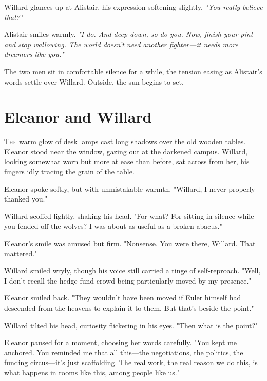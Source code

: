 Willard glances up at Alistair, his expression softening slightly.  
\textit{"You really believe that?"}
\smallskip

Alistair smiles warmly.  
\textit{"I do. And deep down, so do you. Now, finish your pint and stop wallowing. The world doesn’t need another fighter—it needs more dreamers like you."}

\smallskip

The two men sit in comfortable silence for a while, the tension easing as Alistair’s words settle over Willard. Outside, the sun begins to set.

\newpage

\section*{Eleanor and Willard}

\smallskip

\lettrine{T}{he} warm glow of desk lamps cast long shadows over the old wooden tables. Eleanor stood near the window, gazing out at the darkened campus. Willard, looking somewhat worn but more at ease than before, sat across from her, his fingers idly tracing the grain of the table.

\smallskip

Eleanor spoke softly, but with unmistakable warmth.  
"Willard, I never properly thanked you."
\smallskip

Willard scoffed lightly, shaking his head.  
"For what? For sitting in silence while you fended off the wolves? I was about as useful as a broken abacus."
\smallskip

Eleanor’s smile was amused but firm.  
"Nonsense. You were there, Willard. That mattered."
\smallskip

Willard smiled wryly, though his voice still carried a tinge of self-reproach.  
"Well, I don’t recall the hedge fund crowd being particularly moved by my presence."
\smallskip

Eleanor smiled back.  
"They wouldn’t have been moved if Euler himself had descended from the heavens to explain it to them. But that’s beside the point."
\smallskip

Willard tilted his head, curiosity flickering in his eyes.  
"Then what is the point?"
\smallskip

Eleanor paused for a moment, choosing her words carefully.  
"You kept me anchored. You reminded me that all this—the negotiations, the politics, the funding circus—it’s just scaffolding. The real work, the real reason we do this, is what happens in rooms like this, among people like us."
\smallskip

